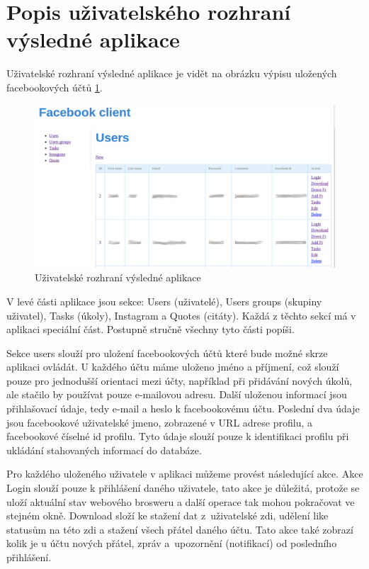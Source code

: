 \documentclass[thesis=M,czech]{FITthesis}[2013/05/10]
\begin{document}
\section{Popis uživatelského rozhraní výsledné aplikace}

Uživatelské rozhraní výsledné aplikace je vidět na obrázku výpisu uložených facebookových účtů \ref{fig:fcUI}.

\begin{figure}[h]
\begin{center}
\includegraphics[width=5in]{figures/fcUI.png}
\caption{Uživatelské rozhraní výsledné aplikace}
\label{fig:fcUI}
\end{center}
\end{figure}

V levé části aplikace jsou sekce: Users (uživatelé), Users groups (skupiny uživatel), Tasks (úkoly), Instagram a Quotes (citáty). Každá z těchto sekcí má v aplikaci speciální část. Postupně stručně všechny tyto části popíši.

Sekce users slouží pro uložení facebookových účtů které bude možné skrze aplikaci ovládát. U každého účtu máme uloženo jméno a příjmení, což slouží pouze pro jednodušší orientaci mezi účty, například při přidávání nových úkolů, ale stačilo by používat pouze e-mailovou adresu. Další uloženou informací jsou přihlašovací údaje, tedy e-mail a heslo k facebookovému účtu. Poslední dva údaje jsou facebookové uživatelské jmeno, zobrazené v URL adrese profilu, a facebookové číselné id profilu. Tyto údaje slouží pouze k identifikaci profilu při ukládání stahovaných informací do databáze. 

Pro každého uloženého uživatele v aplikaci můžeme provést následující akce. Akce Login slouží pouze k přihlášení daného uživatele, tato akce je důležitá, protože se uloží aktuální stav webového brosweru a další operace tak mohou pokračovat ve stejném okně. Download složí ke stažení dat z~uživatelské zdi, udělení like statusům na této zdi a stažení všech přátel daného účtu. Tato akce také zobrazí kolik je u účtu nových přátel, zpráv a~upozornění (notifikací) od posledního přihlášení.
\end{document}

